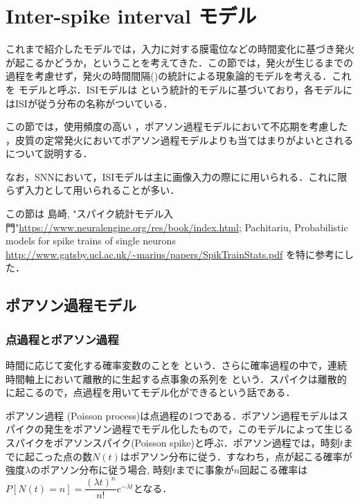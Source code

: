 \section{Inter-spike interval モデル}
これまで紹介したモデルでは，入力に対する膜電位などの時間変化に基づき発火が起こるかどうか，ということを考えてきた．この節では，発火が生じるまでの過程を考慮せず，発火の時間間隔(\textbf{})の統計による現象論的モデルを考える．これを\textbf{} モデルと呼ぶ．ISIモデルは\textbf{} という統計的モデルに基づいており，各モデルにはISIが従う分布の名称がついている．

この節では，使用頻度の高い \textbf{}，ポアソン過程モデルにおいて不応期を考慮した \textbf{}，皮質の定常発火においてポアソン過程モデルよりも当てはまりがよいとされる \textbf{}について説明する．

なお，SNNにおいて，ISIモデルは主に画像入力の際に\textbf{}に用いられる．これに限らず入力として用いられることが多い．


この節は 島崎, "スパイク統計モデル入門"\url{https://www.neuralengine.org/res/book/index.html}; Pachitariu, Probabilistic models for spike trains of single neurons \url{http://www.gatsby.ucl.ac.uk/~marius/papers/SpikTrainStats.pdf} を特に参考にした．
\subsection{ポアソン過程モデル}
\subsubsection{点過程とポアソン過程}
時間に応じて変化する確率変数のことを\textbf{} という．さらに確率過程の中で，連続時間軸上において離散的に生起する点事象の系列を\textbf{} という．スパイクは離散的に起こるので，点過程を用いてモデル化ができるという話である．

ポアソン過程 (Poisson process)は点過程の1つである．ポアソン過程モデルはスパイクの発生をポアソン過程でモデル化したもので，このモデルによって生じるスパイクをポアソンスパイク(Poisson spike)と呼ぶ．ポアソン過程では，時刻$t$までに起こった点の数$N(t)$はポアソン分布に従う．すなわち，点が起こる確率が強度$\lambda$のポアソン分布に従う場合, 時刻$t$までに事象が$n$回起こる確率は$P[N(t)=n]=\dfrac{(\lambda t)^{n}}{n !} e^{-\lambda t}$となる． 

